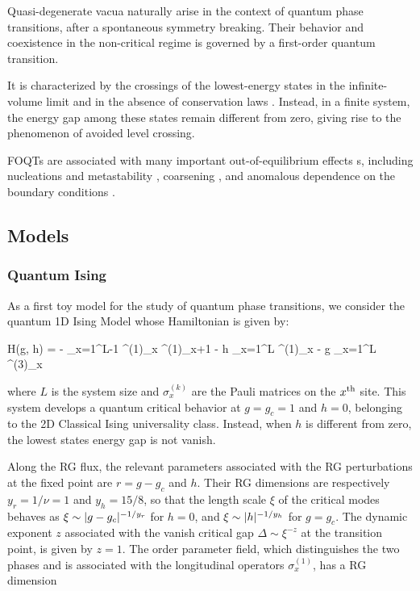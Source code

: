 Quasi-degenerate vacua naturally arise in the context of quantum phase transitions, after a spontaneous symmetry breaking. Their behavior and coexistence in the non-critical regime is governed by a first-order quantum transition.

It is characterized by the crossings of the lowest-energy states in the infinite-volume limit and in the absence of conservation laws \cite{plissetto2023scaling}.
Instead, in a finite system, the energy gap among these states remain different from zero, giving rise to the phenomenon of avoided level crossing.

FOQTs are associated with many important out-of-equilibrium effects s, including nucleations and metastability \cite{binder1987theory,bray2002theory}, coarsening \cite{chandran2012kibble}, and anomalous dependence on the boundary conditions \cite{pelissetto2020scaling,panagopoulos2018dynamic,campostrini2015quantum,pelissetto2018finite,rossini2018ground}.

\subsection{Models}
\label{Models}

\subsubsection{Quantum Ising}
\label{QIsing}

As a first toy model for the study of quantum phase transitions, we consider the quantum 1D Ising Model whose Hamiltonian is given by:

	H(g, h) = - \sum_{x=1}^{L-1} \sigma^{(1)}_x \sigma^{(1)}_{x+1}
	- h \sum_{x=1}^L \sigma^{(1)}_x - g \sum_{x=1}^L \sigma^{(3)}_x \pc
\ee

where $L$ is the system size and $\sigma_x^{(k)}$ are the Pauli matrices on the 
$x^{\rm th}$ site. This system develops a quantum critical behavior at $g = g_c = 1$
and $h=0$, belonging to the 2D Classical Ising universality class. Instead, when $h$
is different from zero, the lowest states energy gap is not vanish.

Along the RG flux, the relevant parameters associated with the RG perturbations at the 
fixed point are $r = g-g_c$ and $h$. Their RG dimensions are respectively $y_r=1/\nu=1$
and $y_h = 15/8$, so that the length scale $\xi$ of the critical modes behaves as
$\xi \sim \lvert g-g_c\rvert^{-1/y_r}$ for $h=0$, and $\xi \sim \lvert h\rvert^{-1/y_h}$ for $g=g_c$.
The dynamic exponent $z$ associated with the vanish critical gap $\Delta \sim \xi^{-z}$
at the transition point, is given by $z=1$. The order parameter field, which distinguishes 
the two phases and is associated with the longitudinal operators $\sigma_x^{(1)}$, has a
RG dimension 

